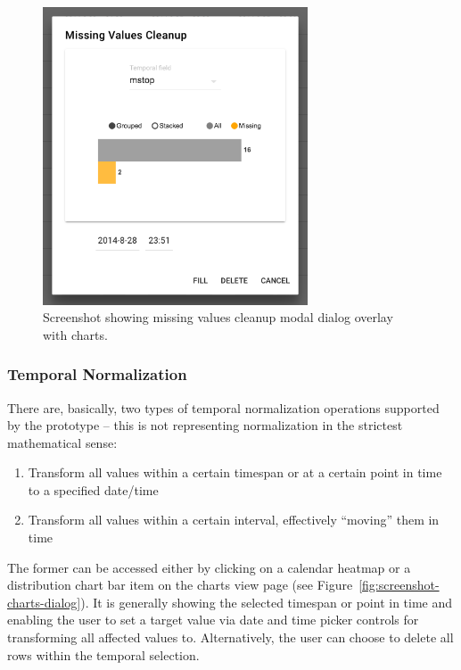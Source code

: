 \begin{figure}[h]
  \centering
  \includegraphics[width=0.7\textwidth]{figures/implementation/screenshot-missing-values}
  \caption{Screenshot showing missing values cleanup modal dialog overlay with charts.}
  \label{fig:screenshot-missing-values}
\end{figure}

\subsubsection{Temporal Normalization}

There are, basically, two types of temporal normalization operations supported by the prototype -- this is not representing normalization in the strictest mathematical sense:

\begin{enumerate}
  \item Transform all values within a certain timespan or at a certain point in time to a specified date/time
  \item Transform all values within a certain interval, effectively ``moving'' them in time
\end{enumerate}

The former can be accessed either by clicking on a calendar heatmap or a distribution chart bar item on the charts view page (see Figure~\ref{fig:screenshot-charts-dialog}).
It is generally showing the selected timespan or point in time and enabling the user to set a target value via date and time picker controls for transforming all affected values to.
Alternatively, the user can choose to delete all rows within the temporal selection.

